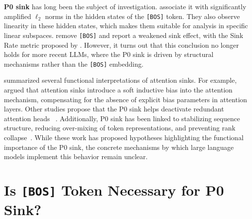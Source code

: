 \documentclass[]{template}
\theoremstyle{plain}
\theoremstyle{definition}
\theoremstyle{remark}
\begin{document}
\textbf{P0 sink} has long been the subject of investigation. \citet{cancedda2024spectralfiltersdarksignals} associate it with significantly amplified $\ell_2$ norms in the hidden states of the \texttt{[BOS]} token. They also observe linearity in these hidden states, which makes them suitable for analysis in specific linear subspaces. \citet{barbero2025llmsattendtoken} remove \texttt{[BOS]} and report a weakened sink effect, with the Sink Rate metric proposed by \citet{gu2025attentionsinkemergeslanguage}. However, it turns out that this conclusion no longer holds for more recent LLMs, where the P0 sink is driven by structural mechanisms rather than the \texttt{[BOS]} embedding.

\citet{zhang2025attentionsinkscatchtag} summarized several functional interpretations of attention sinks. For example, \citet{gu2025attentionsinkemergeslanguage} argued that attention sinks introduce a soft inductive bias into the attention mechanism, compensating for the absence of explicit bias parameters in attention layers. 
Other studies propose that the P0 sink helps deactivate redundant attention heads 
~\citep{guo2025activedormant, sandovalsegura2025identifyingevaluatinginactiveheads}. Additionally, P0 sink has been linked to stabilizing sequence structure, reducing over-mixing of token representations, and preventing rank collapse~\citep{barbero2025llmsattendtoken, geshkovski2024emergenceclustersselfattentiondynamics}.
While these work has proposed hypotheses highlighting the functional importance of the P0 sink, the concrete mechanisms by which large language models implement this behavior remain unclear.


\section{Is \texttt{[BOS]} Token Necessary for P0 Sink?}
\label{sec2}
\end{document}

